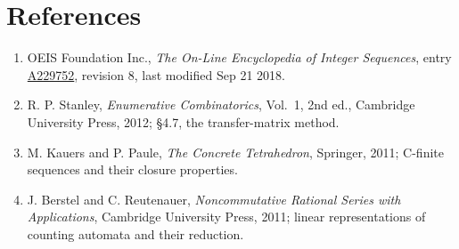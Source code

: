 \documentclass[11pt]{article}
\theoremstyle{definition}
\begin{document}
\section{References}

\begin{enumerate}

\item OEIS Foundation Inc., \emph{The On-Line Encyclopedia of Integer Sequences}, entry \href{https://oeis.org/A229752}{A229752}, revision 8, last modified Sep 21 2018.

\item R. P. Stanley, \emph{Enumerative Combinatorics}, Vol.~1, 2nd ed., Cambridge University Press, 2012; \S4.7, the transfer-matrix method.

\item M. Kauers and P. Paule, \emph{The Concrete Tetrahedron}, Springer, 2011; C-finite sequences and their closure properties.

\item J. Berstel and C. Reutenauer, \emph{Noncommutative Rational Series with Applications}, Cambridge University Press, 2011; linear representations of counting automata and their reduction.

\end{enumerate}
\end{document}
